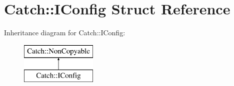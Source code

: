 \hypertarget{structCatch_1_1IConfig}{}\section{Catch\+::I\+Config Struct Reference}
\label{structCatch_1_1IConfig}
Inheritance diagram for Catch\+::I\+Config\+:\begin{figure}[H]
\begin{center}
\leavevmode
\includegraphics[height=2.000000cm]{structCatch_1_1IConfig}
\end{center}
\end{figure}
